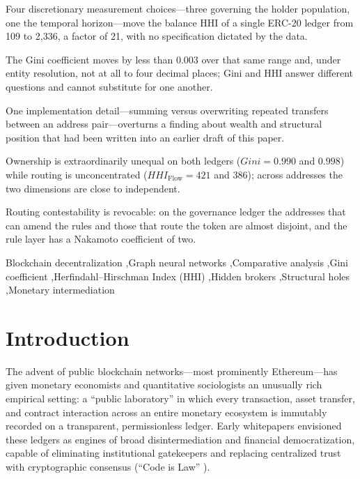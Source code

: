 \documentclass[final,5p,times]{elsarticle}
\begin{document}
\begin{frontmatter}
\begin{highlights}
\item Four discretionary measurement choices---three governing the holder
population, one the temporal horizon---move the balance HHI of a single
ERC-20 ledger from 109 to 2,336, a factor of 21, with no specification
dictated by the data.
\item The Gini coefficient moves by less than $0.003$ over that same range and,
under entity resolution, not at all to four decimal places; Gini and HHI
answer different questions and cannot substitute for one another.
\item One implementation detail---summing versus overwriting repeated
transfers between an address pair---overturns a finding about wealth and structural position that had
been written into an earlier draft of this paper.
\item Ownership is extraordinarily unequal on both ledgers ($Gini = 0.990$ and
$0.998$) while routing is unconcentrated ($HHI_{\text{Flow}} = 421$ and
$386$); across addresses the two dimensions are close to independent.
\item Routing contestability is revocable: on the governance ledger the
addresses that can amend the rules and those that route the token are almost
disjoint, and the rule layer has a Nakamoto coefficient of two.
\end{highlights}

\begin{keyword}
Blockchain decentralization \sep Graph neural networks \sep Comparative analysis \sep Gini coefficient \sep Herfindahl--Hirschman Index (HHI) \sep Hidden brokers \sep Structural holes \sep Monetary intermediation
\end{keyword}

\end{frontmatter}


\section{Introduction}
\label{sec:intro}

The advent of public blockchain networks---most prominently Ethereum---has given monetary economists and quantitative sociologists an unusually rich empirical setting: a ``public laboratory'' in which every transaction, asset transfer, and contract interaction across an entire monetary ecosystem is immutably recorded on a transparent, permissionless ledger. Early whitepapers \cite{nakamoto2008bitcoin, wood2014ethereum} envisioned these ledgers as engines of broad disintermediation and financial democratization, capable of eliminating institutional gatekeepers and replacing centralized trust with cryptographic consensus (``Code is Law'' \cite{lessig1999code}).
\end{document}
